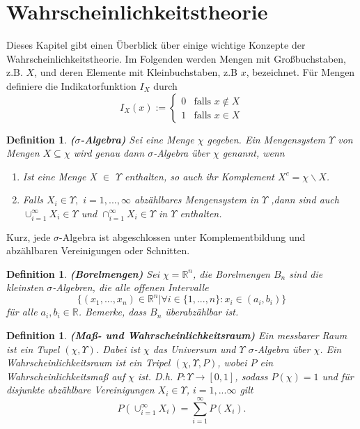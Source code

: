 \documentclass[12pt,a4paper]{scrartcl}
\newtheorem{Definition}[Satz]{Definition}
\numberwithin{equation}{section}
\newcommand{\R}{\mathbb{R}} %
\begin{document}
{\section{Wahrscheinlichkeitstheorie}
Dieses Kapitel gibt einen Überblick über einige wichtige Konzepte der Wahrscheinlichkeitstheorie.
Im Folgenden werden Mengen mit Großbuchstaben, z.B. $X$, und deren Elemente mit Kleinbuchstaben, z.B $x$,
bezeichnet. Für Mengen definiere die Indikatorfunktion $I_{X}$ durch 
$$
I_{X}(x) := \begin{cases}0&\text{falls }x\notin X\\1&\text{falls }x \in X\end{cases}
$$

\begin{Definition}\textbf{($\sigma$-Algebra)}
 Sei eine Menge $\chi$ gegeben. Ein Mengensystem $\varUpsilon$ von Mengen $X \subseteq \chi$ wird 
 genau dann $\sigma$-Algebra über $\chi$ genannt, wenn 
 \begin{enumerate}
  \item Ist eine Menge X $\in$ $\varUpsilon$ enthalten, so auch ihr Komplement $X^{c} = \chi \backslash X$.
  \item Falls $X_{i} \in \varUpsilon,$ $i=1,...,\infty$ abzählbares Mengensystem in $\varUpsilon$
  ,dann sind auch $\cup_{i=1}^{\infty}X_{i} \in \varUpsilon$ und $\cap_{i=1}^{\infty}X_{i} \in \varUpsilon$ in 
  $\varUpsilon$ enthalten.
 \end{enumerate}

\end{Definition}

Kurz, jede $\sigma$-Algebra ist abgeschlossen unter Komplementbildung und abzählbaren Vereinigungen oder
Schnitten. 

\begin{Definition}\textbf{(Borelmengen)}
 Sei $\chi = \R^{n}$, die Borelmengen $B_{n}$ sind die kleinsten $\sigma$-Algebren, die alle 
 offenen Intervalle 
 $$
 \textit{\{}(x_{1},...,x_{n})\in \R^{n} | \forall i \in \textit{\{}1,...,n\textit{\}}: x_{i} \in (a_{i},b_{i})\textit{\}}
 $$
 für alle $a_{i},b_{i} \in \R$. Bemerke, dass $B_{n}$ überabzählbar ist. 
\end{Definition}

\begin{Definition}\textbf{(Maß- und Wahrscheinlichkeitsraum)}
 Ein messbarer Raum ist ein Tupel $(\chi,\varUpsilon)$. Dabei ist $\chi$ das Universum und 
 $\varUpsilon$ $\sigma$-Algebra über $\chi$. Ein Wahrscheinlichkeitsraum ist ein Tripel $(\chi,\varUpsilon,P)$,
 wobei $P$ ein Wahrscheinlichkeitsmaß auf $\chi$ ist. D.h. $P: \varUpsilon \rightarrow [0,1]$, sodass
 $P(\chi) = 1$ und für disjunkte abzählbare Vereinigungen $X_{i} \in \varUpsilon$, $i= 1,...\infty$ gilt
 $$
 P(\cup_{i=1}^{\infty}X_{i}) = \sum_{i=1}^{\infty}P(X_{i}).
 $$
 \end{Definition}

}
\end{document}
